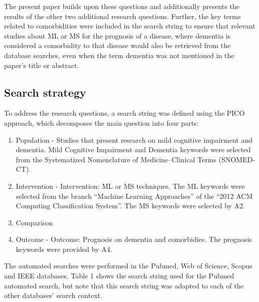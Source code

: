 \documentclass[12pt]{article}
\begin{document}
The present paper builds upon these questions and additionally presents the results of the other two additional research questions. Further, the key terms related to comorbidities were included in the search string to ensure that relevant studies about ML or MS for the prognosis of a disease, where dementia is considered a comorbidity to that disease would also be retrieved from the database searches, even when the term dementia was not mentioned in the paper’s title or abstract.

\subsection{Search strategy}
To address the research questions, a search string was defined using the PICO approach, which decomposes the main question into four parts: 
\begin{enumerate}
	\item Population - Studies that present research on mild cognitive impairment and dementia. Mild Cognitive Impairment and Dementia keywords were selected from the Systematized Nomenclature of Medicine–Clinical Terms (SNOMED-CT).
	\item Intervention - Intervention: ML or MS techniques. The ML keywords were selected from the branch “Machine Learning Approaches” of the “2012 ACM Computing Classification System”. The MS keywords were selected by A2.
	\item Comparison
	\item Outcome - Outcome: Prognosis on dementia and comorbidies. The prognosis keywords were provided
by A4.
\end{enumerate}

The automated searches were performed in the Pubmed, Web of Science, Scopus and IEEE databases. Table 1 shows the search string used for the Pubmed automated search, but note that this search string was adapted to each of the other databases’ search context.
\end{document}
